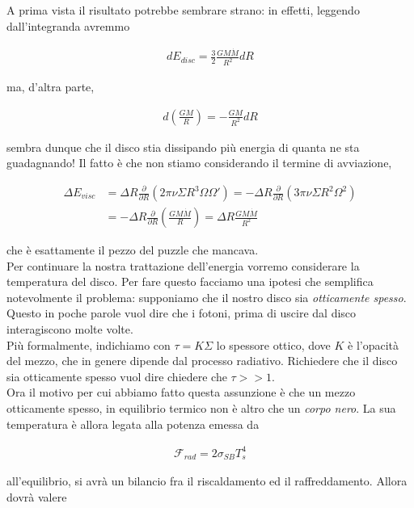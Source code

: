 \documentclass{report}
\begin{document}
A prima vista il risultato potrebbe sembrare strano: in effetti, leggendo dall'integranda avremmo 

\begin{align}
    dE_{disc} = \frac{3}{2}\frac{GM\dot{M}}{R^2}dR
\end{align}

ma, d'altra parte, 

\begin{align}
    d\left(\frac{GM}{R} \right) = -\frac{GM}{R^2}dR
\end{align}

sembra dunque che il disco stia dissipando più energia di quanta ne sta guadagnando! Il fatto è che non stiamo considerando il termine di avviazione, 

\begin{align}
    \Delta E_{visc} &= \Delta R \frac{\partial}{\partial R}(2\pi \nu \Sigma R^3 \Omega \Omega') = -\Delta R \frac{\partial}{\partial R}(3\pi\nu\Sigma R^2\Omega^2) \\
    &= -\Delta R \frac{\partial}{\partial R}\left(\frac{GM\dot{M}}{R} \right) = \Delta R \frac{GM\dot{M}}{R^2}
\end{align}

che è esattamente il pezzo del puzzle che mancava. \\

Per continuare la nostra trattazione dell'energia vorremo considerare la temperatura del disco. Per fare questo facciamo una ipotesi che semplifica notevolmente il problema: supponiamo che il nostro disco sia \emph{otticamente spesso}. Questo in poche parole vuol dire che i fotoni, prima di uscire dal disco interagiscono molte volte. \\

Più formalmente, indichiamo con \(\tau = K \Sigma\) lo spessore ottico, dove \(K\) è l'opacità del mezzo, che in genere dipende dal processo radiativo. Richiedere che il disco sia otticamente spesso vuol dire chiedere che \(\tau >> 1\). \\

Ora il motivo per cui abbiamo fatto questa assunzione è che un mezzo otticamente spesso, in equilibrio termico non è altro che un \emph{corpo nero}. La sua temperatura è allora legata alla potenza emessa da 

\begin{align}
    \mathcal{F}_{rad} = 2\sigma_{SB}T_s^4
\end{align}

all'equilibrio, si avrà un bilancio fra il riscaldamento ed il raffreddamento. Allora dovrà valere 
\end{document}
